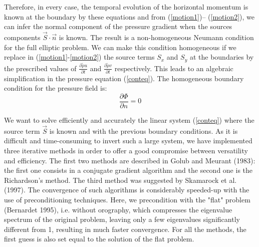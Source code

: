 Therefore, in every case, the temporal evolution of the horizontal momentum is
known at the boundary by these equations and from (\ref{motion1})--
(\ref{motion2}), we can infer the normal component of the pressure gradient
when the sources components $\vec{S} \cdot \vec{n}$ is known.
The result is a non-homogeneous Neumann condition for the full elliptic
problem. We can make this condition homogeneous if we replace in
(\ref{motion1}-\ref{motion2}) the source terms $S_x$ and $S_y$ at the
boundaries by the prescribed values of $\frac {\partial{\tilde{\rho} { u }}
} {\partial{t} }$ and $\frac {\partial{\tilde{\rho} { v }} }
{\partial{t} }$ respectively. This leads to an algebraic simplification
in the pressure equation (\ref{conteq}). The homogeneous boundary condition
for the pressure field is:
\begin{equation}
\label{hb1}
\dfrac{\partial{\Phi } } {\partial{n} } = 0
\end{equation}
\par We want to solve efficiently and accurately the linear system
(\ref{conteq}) where the source term $\overrightarrow {S}$ is known and with
the previous boundary conditions. As it is
difficult and time-consuming to invert such a large system, we have
implemented three iterative methods in order to offer a good compromise between
versatility and efficiency. The first two methods are described
in Golub and Meurant (1983): the first one consists in
a conjugate gradient algorithm and the second one is the Richardson's method.
The third method was suggested by Skamarock et al. (1997).
The convergence of such algorithms is considerably speeded-up with the use
of preconditioning techniques. Here, we precondition with the "flat"
problem (Bernardet 1995), i.e. without orography, which
compresses the eigenvalue spectrum of the original problem, leaving only a few
eigenvalues significantly different from 1, resulting in much faster
convergence. For all the methods, the first guess is also set equal to the
solution of the flat problem.

